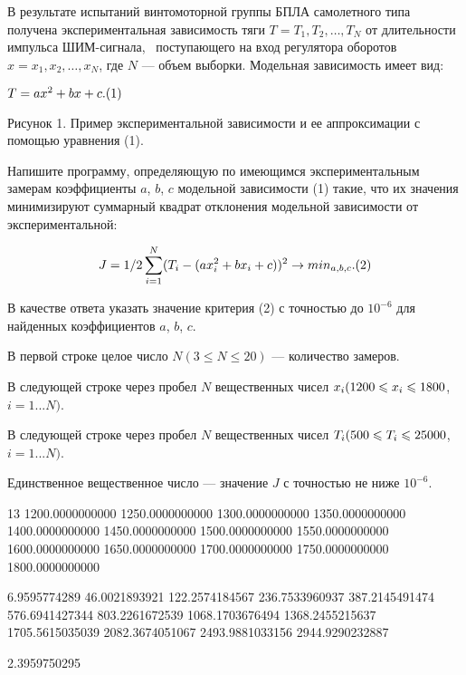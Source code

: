 
В результате испытаний винтомоторной группы БПЛА самолетного типа получена экспериментальная 
зависимость тяги $T= {T_1, T_2, \dots, T_N}$ от длительности импульса ШИМ-сигнала, \
поступающего на вход регулятора оборотов $x = {x_1, x_2,
\dots ,x_N}$, где \linebreak $N$ — объем выборки. Модельная зависимость имеет вид:

$T= ax^2 + bx + c.\space(1)$


Рисунок 1. Пример экспериментальной
зависимости и ее аппроксимации с помощью уравнения (1).

Напишите программу, определяющую по имеющимся
экспериментальным замерам коэффициенты $a$, $b$, $c$  модельной зависимости (1) 
такие, что их значения минимизируют суммарный квадрат отклонения модельной
зависимости от экспериментальной:

$$J=1/2 \sum\limits_{i=1}^N(T_i-(ax_i^2+bx_i+c))^2 \to min_{a,b,c}.\space (2) $$

В качестве ответа указать значение критерия (2) с точностью до $10^{-6}$ для найденных коэффициентов 
$a$, $b$, $c$.


В первой строке целое число $N (3\leq N\leq 20)$  — количество замеров.

В следующей строке через пробел $N$  вещественных чисел $x_i\space (1200\leq x_i \leq 1800$,\linebreak $i = 1...N)$. 

В следующей строке через пробел $N$  вещественных чисел $T_i\space (500\leq T_i \leq 25000$, \linebreak $i = 1...N)$.

\outputfmtSection

Единственное вещественное число — значение  $J$  с точностью не ниже $10^{-6}$.

\begin{myverbbox}[\small]{\vinput}
    13
    1200.0000000000 1250.0000000000 1300.0000000000 1350.0000000000 
    1400.0000000000 1450.0000000000 1500.0000000000 1550.0000000000 
    1600.0000000000 1650.0000000000 1700.0000000000 1750.0000000000 
    1800.0000000000 
    
    6.9595774289 46.0021893921 122.2574184567 236.7533960937 
    387.2145491474 576.6941427344 803.2261672539 1068.1703676494 
    1368.2455215637 1705.5615035039 2082.3674051067 2493.9881033156 
    2944.9290232887
\end{myverbbox}
\begin{myverbbox}[\small]{\voutput}
    2.3959750295
\end{myverbbox}

